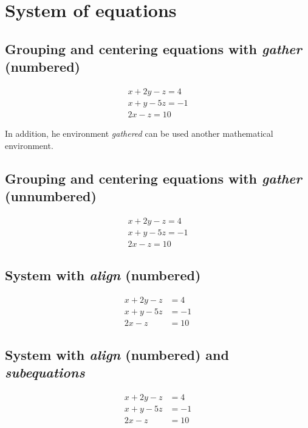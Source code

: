 \documentclass{article}
\begin{document}
\section*{System of equations}

\subsection*{Grouping and centering equations with \emph{gather} (numbered)}

\begin{gather}
	x + 2y - z = 4 \\
	x + y - 5z = -1 \\
	2x - z = 10
\end{gather}

In addition, he environment \emph{gathered} can be used another mathematical environment.

\subsection*{Grouping and centering equations with \emph{gather} (unnumbered)}

\begin{gather*}
x + 2y - z = 4 \\
x + y - 5z = -1 \\
2x - z = 10
\end{gather*}

\subsection*{System with \emph{align} (numbered)}

\begin{align}
	x + 2y - z &= 4 \\
	x + y - 5z &= -1 \\
	2x - z &= 10
\end{align}

\subsection*{System with \emph{align} (numbered) and \emph{subequations}}

\begin{subequations}
	\begin{align}
		x + 2y - z &= 4 \\
		x + y - 5z &= -1 \\
		2x - z &= 10
	\end{align}
\end{subequations}
\end{document}
